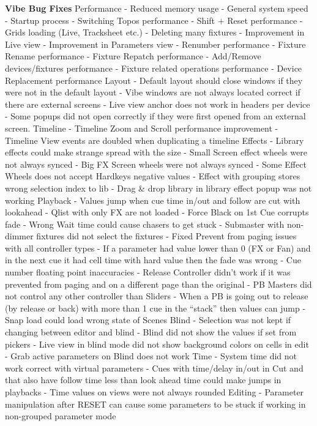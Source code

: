 \documentclass[
]{article}
\begin{document}
\textbf{Vibe Bug Fixes}
Performance
- Reduced memory usage
- General system speed
- Startup process
- Switching Topos performance
- Shift + Reset performance
- Grids loading (Live, Tracksheet etc.)
- Deleting many fixtures
- Improvement in Live view
- Improvement in Parameters view
- Renumber performance
- Fixture Rename performance
- Fixture Repatch performance
- Add/Remove devices/fixtures performance
- Fixture related operations performance
- Device Replacement performance
Layout
- Default layout should close windows if they were not in the default layout
- Vibe windows are not always located correct if there are external screens
- Live view anchor does not work in headers per device
- Some popups did not open correctly if they were first opened from an external screen.
Timeline
- Timeline Zoom and Scroll performance improvement
- Timeline View events are doubled when duplicating a timeline
Effects
- Library effects could make strange spread with the size
- Small Screen effect wheels were not always synced
- Big FX Screen wheels were not always synced
- Some Effect Wheels does not accept Hardkeys negative values
- Effect with grouping stores wrong selection index to lib
- Drag \& drop library in library effect popup was not working
Playback
- Values jump when cue time in/out and follow are cut with lookahead
- Qlist with only FX are not loaded
- Force Black on 1st Cue corrupts fade
- Wrong Wait time could cause chasers to get stuck
- Submaster with non-dimmer fixtures did not select the fixtures
- Fixed Prevent from paging issues with all controller types
- If a parameter had value lower than 0 (FX or Fan) and in the next cue it had cell time with hard value then the fade was wrong
- Cue number floating point inaccuracies
- Release Controller didn't work if it was prevented from paging and on a different page than the original
- PB Masters did not control any other controller than Sliders
- When a PB is going out to release (by release or back) with more than 1 cue in the ``stack'' then values can jump
- Snap load could load wrong state of Scenes
Blind
- Selection was not kept if changing between editor and blind
- Blind did not show the values if set from pickers
- Live view in blind mode did not show background colors on cells in edit
- Grab active parameters on Blind does not work
Time
- System time did not work correct with virtual parameters
- Cues with time/delay in/out in Cut and that also have follow time less than look ahead time could make jumps in playbacks
- Time values on views were not always rounded
Editing
- Parameter manipulation after RESET can cause some parameters to be stuck if working in non-grouped parameter mode
\end{document}
